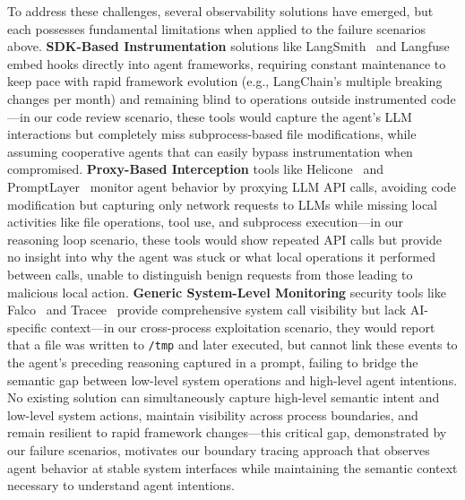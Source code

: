 To address these challenges, several observability solutions have emerged, but each possesses fundamental limitations when applied to the failure scenarios above. \textbf{SDK-Based Instrumentation} solutions like LangSmith~\cite{langsmith} and Langfuse~\cite{langfuse} embed hooks directly into agent frameworks, requiring constant maintenance to keep pace with rapid framework evolution (e.g., LangChain's multiple breaking changes per month) and remaining blind to operations outside instrumented code—in our code review scenario, these tools would capture the agent's LLM interactions but completely miss subprocess-based file modifications, while assuming cooperative agents that can easily bypass instrumentation when compromised. \textbf{Proxy-Based Interception} tools like Helicone~\cite{helicone} and PromptLayer~\cite{promptlayer} monitor agent behavior by proxying LLM API calls, avoiding code modification but capturing only network requests to LLMs while missing local activities like file operations, tool use, and subprocess execution—in our reasoning loop scenario, these tools would show repeated API calls but provide no insight into why the agent was stuck or what local operations it performed between calls, unable to distinguish benign requests from those leading to malicious local action. \textbf{Generic System-Level Monitoring} security tools like Falco~\cite{falco} and Tracee~\cite{tracee} provide comprehensive system call visibility but lack AI-specific context—in our cross-process exploitation scenario, they would report that a file was written to \texttt{/tmp} and later executed, but cannot link these events to the agent's preceding reasoning captured in a prompt, failing to bridge the semantic gap between low-level system operations and high-level agent intentions. No existing solution can simultaneously capture high-level semantic intent and low-level system actions, maintain visibility across process boundaries, and remain resilient to rapid framework changes—this critical gap, demonstrated by our failure scenarios, motivates our boundary tracing approach that observes agent behavior at stable system interfaces while maintaining the semantic context necessary to understand agent intentions.